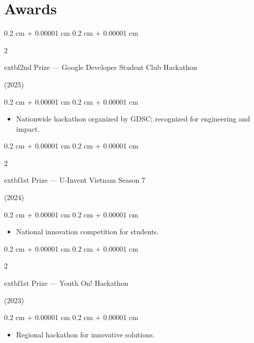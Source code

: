 \documentclass[10pt, letterpaper]{article}
\newenvironment{highlights}{
    \begin{itemize}[
        topsep=0.10 cm,
        parsep=0.10 cm,
        partopsep=0pt,
        itemsep=0pt,
        leftmargin=0.4 cm + 10pt
    ]
}{
    \end{itemize}
} %
\newenvironment{onecolentry}{
    \begin{adjustwidth}{
        0.2 cm + 0.00001 cm
    }{
        0.2 cm + 0.00001 cm
    }
}{
    \end{adjustwidth}
} %
\newenvironment{twocolentry}[2][]{
    \onecolentry
    \def\secondColumn{#2}
    \setcolumnwidth{\fill, 4.5 cm}
    \begin{paracol}{2}
}{
    \switchcolumn \raggedleft \secondColumn
    \end{paracol}
    \endonecolentry
} %
\begin{document}
        \vspace{0.2 cm}

    \section{Awards}

        \begin{twocolentry}{(2025)}
            	extbf{2nd Prize — Google Developer Student Club Hackathon}
        \end{twocolentry}

        \vspace{0.10 cm}
        \begin{onecolentry}
            \begin{highlights}
                \item Nationwide hackathon organized by GDSC; recognized for engineering and impact.
            \end{highlights}
        \end{onecolentry}

        \vspace{0.2 cm}

        \begin{twocolentry}{(2024)}
            	extbf{1st Prize — U-Invent Vietnam Season 7}
        \end{twocolentry}

        \vspace{0.10 cm}
        \begin{onecolentry}
            \begin{highlights}
                \item National innovation competition for students.
            \end{highlights}
        \end{onecolentry}

        \vspace{0.2 cm}

        \begin{twocolentry}{(2023)}
            	extbf{1st Prize — Youth On! Hackathon}
        \end{twocolentry}

        \vspace{0.10 cm}
        \begin{onecolentry}
            \begin{highlights}
                \item Regional hackathon for innovative solutions.
            \end{highlights}
        \end{onecolentry}
\end{document}
